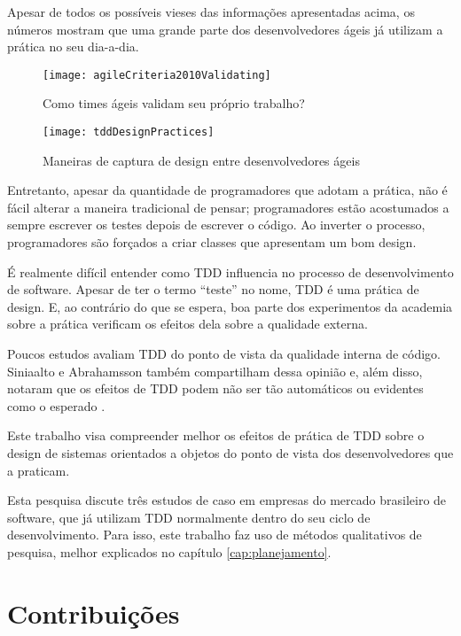 Apesar de todos os possíveis vieses das informações apresentadas acima, os
números mostram que uma grande parte dos desenvolvedores ágeis já utilizam a 
prática no seu dia-a-dia.

\begin{figure}[]
  \centering
  \texttt{[image: agileCriteria2010Validating]}
  \caption{Como times ágeis validam seu próprio trabalho?}
  \label{fig:wambler-agile-2010}
\end{figure}

\begin{figure}[]
  \centering
  \texttt{[image: tddDesignPractices]}
  \caption{Maneiras de captura de design entre desenvolvedores ágeis}   
  \label{fig:wambler-tdd-2008}
\end{figure}

Entretanto, apesar da quantidade de programadores que adotam a prática, não é
fácil alterar a maneira tradicional de pensar; programadores estão acostumados a
sempre escrever os testes depois de escrever o código. Ao inverter o processo,
programadores são forçados a criar classes que apresentam um bom design.

É realmente difícil entender como TDD influencia no processo de desenvolvimento
de software. Apesar de ter o termo ``teste'' no nome, TDD é uma prática
de design. E, ao contrário do que se espera, boa parte dos experimentos da
academia sobre a prática verificam os efeitos dela sobre a qualidade externa. 

Poucos estudos avaliam TDD do ponto de vista da qualidade interna de código.
Siniaalto e Abrahamsson também compartilham dessa opinião e, além disso, notaram
que os efeitos de TDD podem não ser tão automáticos ou evidentes como o 
esperado \cite{alarming-results}.

Este trabalho visa compreender melhor os efeitos de prática de TDD sobre o
design de sistemas orientados a objetos do ponto de vista dos desenvolvedores
que a praticam. 

Esta pesquisa discute três estudos de caso em empresas do mercado brasileiro de
software, que já utilizam TDD normalmente dentro do seu ciclo de
desenvolvimento. Para isso, este trabalho faz uso de métodos qualitativos de
pesquisa, melhor explicados no capítulo \ref{cap:planejamento}.

\section{Contribuições}

